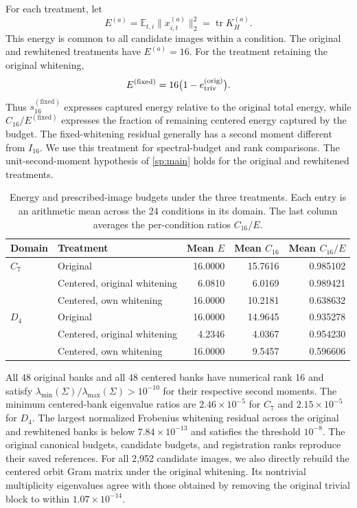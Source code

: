 For each treatment, let
\[
 E^{(a)}
   =\mathbb E_{t,i}\|x^{(a)}_{i,t}\|_2^2
   =\operatorname{tr}K_H^{(a)}.
\]
This energy is common to all candidate images within a condition.
The original and rewhitened treatments have $E^{(a)}=16$.
For the treatment retaining the original whitening,
\[
 E^{(\mathrm{fixed})}
   =16\bigl(1-e_{\rm triv}^{(\mathrm{orig})}\bigr).
\]
Thus $s_{16}^{(\mathrm{fixed})}$ expresses captured energy
relative to the original total energy, while
$C_{16}/E^{(\mathrm{fixed})}$ expresses the fraction of
remaining centered energy captured by the budget.
The fixed-whitening residual generally has a second moment
different from $I_{16}$.
We use this treatment for spectral-budget and rank comparisons.
The unit-second-moment hypothesis of
\cref{sp:main} holds for the original and rewhitened treatments.

\begin{table}[H]
\centering
\small
\setlength{\tabcolsep}{5pt}
\caption{
Energy and prescribed-image budgets under the three treatments.
Each entry is an arithmetic mean across the 24 conditions
in its domain.
The last column averages the per-condition ratios $C_{16}/E$.
}
\label{tab:template-centering-energy}
\begin{tabular}{llrrr}
\toprule
Domain & Treatment & Mean $E$ & Mean $C_{16}$
       & Mean $C_{16}/E$ \\
\midrule
$C_7$ & Original
      & 16.0000 & 15.7616 & 0.985102 \\
      & Centered, original whitening
      & 6.0810 & 6.0169 & 0.989421 \\
      & Centered, own whitening
      & 16.0000 & 10.2181 & 0.638632 \\
\midrule
$D_4$ & Original
      & 16.0000 & 14.9645 & 0.935278 \\
      & Centered, original whitening
      & 4.2346 & 4.0367 & 0.954230 \\
      & Centered, own whitening
      & 16.0000 & 9.5457 & 0.596606 \\
\bottomrule
\end{tabular}
\end{table}

All 48 original banks and all 48 centered banks have numerical
rank 16 and satisfy
$\lambda_{\min}(\Sigma)/
 \lambda_{\max}(\Sigma)>10^{-10}$
for their respective second moments.
The minimum centered-bank eigenvalue ratios are
$2.46\times10^{-5}$ for $C_7$ and
$2.15\times10^{-5}$ for $D_4$.
The largest normalized Frobenius whitening residual across
the original and rewhitened banks is below
$7.84\times10^{-13}$ and satisfies the threshold $10^{-8}$.
The original canonical budgets, candidate budgets, and
registration ranks reproduce their saved references.
For all 2,952 candidate images, we also directly rebuild
the centered orbit Gram matrix under the original whitening.
Its nontrivial multiplicity eigenvalues agree with those
obtained by removing the original trivial block to within
$1.07\times10^{-14}$.

